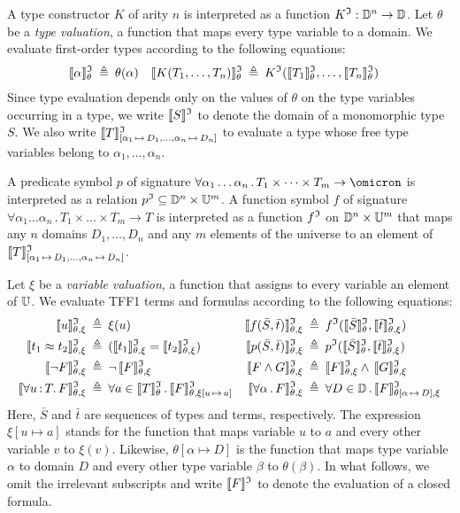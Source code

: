 A type constructor $K$ of arity $n$ is interpreted as a function
$K^{\mathfrak{I}} : \mathbb{D}^n \to \mathbb{D}$.
Let $\theta$ be a {\em type valuation}, a function that maps every
type variable to a domain. We evaluate first-order types according
to the following equations:
\begin{align*}
\llbracket\alpha\rrbracket^{\mathfrak{I}}_{\theta} &\:\triangleq\: \theta(\alpha) &
\llbracket K(T_1,\dots,T_n)\rrbracket^{\mathfrak{I}}_{\theta} &\:\triangleq\: K^{\mathfrak{I}}(\llbracket T_1\rrbracket^{\mathfrak{I}}_{\theta},\dots,\llbracket T_n\rrbracket^{\mathfrak{I}}_{\theta})
\end{align*}
Since type evaluation depends only on the values of $\theta$
on the type variables occurring in a type, we write $\llbracket S\rrbracket^{\mathfrak{I}}$
to denote the domain of a monomorphic type $S$. We also write
$\llbracket T\rrbracket^{\mathfrak{I}}_{[\alpha_1\,\mapsto\,D_1,\dots,\alpha_n\,\mapsto\,D_n]}$
to evaluate a type whose free type variables
belong to $\alpha_1,\dots,\alpha_n$.

A predicate symbol $p$ of signature
$\forall \alpha_1\dots\alpha_n \,.\, T_1 \times \dots \times T_m
\to \omicron$ is interpreted as a relation
$p^{\mathfrak{I}} \subseteq \mathbb{D}^n \times \mathbb{U}^m$.
A function symbol $f$ of signature
$\forall \alpha_1\dots\alpha_n \,.\, T_1 \times \dots \times T_m \to T$
is interpreted as a function
$f^{\mathfrak{I}}$ on $\mathbb{D}^n \times \mathbb{U}^m$ that
maps any $n$ domains $D_1,\dots,D_n$ and
any $m$ elements of the universe
to an element of
$\llbracket T\rrbracket^{\mathfrak{I}}_{[\alpha_1\,\mapsto\,D_1,\dots,\alpha_n\,\mapsto\,D_n]}$.

Let $\xi$ be a {\em variable valuation}, a function that assigns
to every variable an element of $\mathbb{U}$. We evaluate TFF1 terms
and formulas according to the following equations:
\begin{align*}
\eval{u} &\eqdef \xi(u) &
\eval{f(\bar{S},\bar{t})} &\eqdef f^\cI(\evalT{\bar{S}},\eval{\bar{t}}) \\
\eval{t_1 \approx t_2} &\eqdef (\eval{t_1} = \eval{t_2}) &
\eval{p(\bar{S},\bar{t})} &\eqdef p^\cI(\evalT{\bar{S}},\eval{\bar{t}}) \\
\eval{\lnot F} &\eqdef \lnot\, \eval{F} &
\eval{F \land G} &\eqdef \eval{F} \land\, \eval{G} \\
\eval{\forall u \ty T .\, F} &\eqdef \forall {a \in \evalT{T}} \,.\,
\evalG{F}_{\theta,\xi[u\,\mapsto\,a]} &
\eval{\forall \alpha \,.\, F} &\eqdef \forall {D \in \sorts} \,.\,
\evalG{F}_{\theta[\alpha\,\mapsto\,D],\xi} %
\end{align*}
Here, $\bar{S}$ and $\bar{t}$ are sequences of types and terms, respectively.
The expression $\xi[u \mapsto a]$ stands for the function that
maps variable $u$ to $a$ and every other variable $v$ to $\xi(v)$.
Likewise, $\theta[\alpha \mapsto D]$ is the function that maps
type variable $\alpha$ to domain $D$ and every other type
variable $\beta$ to $\theta(\beta)$. In what follows,
we omit the irrelevant subscripts and write $\llbracket F\rrbracket^{\mathfrak{I}}$
to denote the evaluation of a closed formula.

